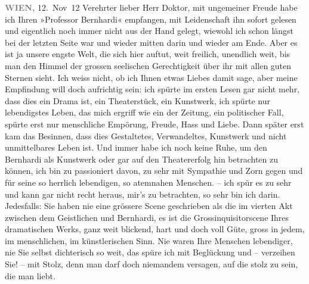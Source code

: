 \pstart
           \raggedleft{}\textcolor{gray}{\textbf{WIEN,}}{ }12. Nov 12\pend
           {\vspace{1\baselineskip}}
\pstart{}Verehrter lieber Herr Doktor,\pend\vspace{0.5em}
\pstart
            mit ungemeiner Freude habe ich Ihren »Professor
                        Bernhardi« empfangen, mit Leidenschaft ihn sofort gelesen und
                    eigentlich noch immer nicht aus der Hand gelegt, wiewohl ich schon längst bei
                    der letzten Seite war und wieder mitten darin und wieder am Ende. Aber es ist ja
                    unsere engste Welt, die sich hier auftut, weit freilich, unendlich weit, bis man
                    den Himmel der grossen seelischen Gerechtigkeit über ihr mit allen guten Sternen
                    sieht. Ich weiss nicht, ob ich Ihnen etwas Liebes damit sage, aber meine
                    Empfindung will doch aufrichtig sein: {\pb}ich spürte im ersten Lesen gar
                    nicht mehr, dass dies ein Drama ist, ein Theaterstück, ein Kunstwerk, ich spürte
                    nur lebendigstes Leben, das mich ergriff wie ein \label{K_L03639-1v}\label{K_L03639-1} der Zeitung, ein politischer Fall, spürte erst
                    nur menschliche Empörung, Freude, Hass und Liebe. Dann später erst kam das
                    Besinnen, dass dies Gestaltetes, Verwandeltes, Kunstwerk und nicht unmittelbares
                    Leben ist. Und  immer habe ich noch keine
                    Ruhe, um den Bernhardi als Kunstwerk oder
                    gar auf den Theatererfolg hin betrachten zu können, ich bin zu passioniert
                    davon, zu sehr mit Sympathie und Zorn gegen und für seine so herrlich
                    lebendigen, so atemnahen Menschen. \label{K_L03639-2v}\label{K_L03639-2} – ich spür es zu sehr und {\pb}kann gar nicht recht heraus, mir's
                    zu betrachten, so sehr bin ich darin. Jedesfalls: Sie haben nie eine grössere
                    Scene geschrieben als die im vierten Akt zwischen dem Geistlichen und Bernhardi,
                    es ist die Grossinquisitorscene Ihres dramatischen Werks, ganz weit blickend,
                    hart und doch voll Güte, gross in jedem, im menschlichen, im künstlerischen
                    Sinn. Nie waren Ihre Menschen lebendiger, nie Sie selbst dichterisch so weit,
                    das spüre ich mit Beglückung und – verzeihen Sie! – mit Stolz, denn man darf
                    doch niemandem versagen, auf die stolz zu sein, die man liebt.\pend
           
